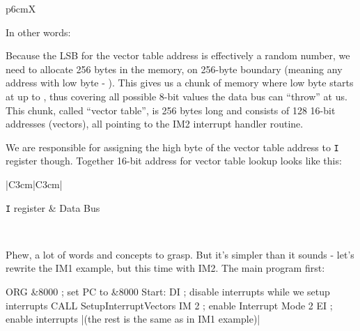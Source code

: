 \begin{tabularx}{\linewidth}{p{6cm}X}
	\begin{description}[topsep=0pt,itemsep=1pt,labelindent=-1.25ex,leftmargin=0cm]
		\item In other words:
		
		\item Because the LSB for the vector table address is effectively a random number, we need to allocate 256 bytes in the memory, on 256-byte boundary (meaning any address with low byte  - ). This gives us a chunk of memory where low byte starts at  up to , thus covering all possible 8-bit values the data bus can ``throw'' at us. This chunk, called ``vector table'', is 256 bytes long and consists of 128 16-bit addresses (vectors), all pointing to the IM2 interrupt handler routine.
		
		\item We are responsible for assigning the high byte of the vector table address to {\tt I} register though. Together 16-bit address for vector table lookup looks like this:
	\end{description}
	
	\vspace*{1ex}

	{ %
	\begin{ElegantTable}{|C{3cm}|C{3cm}|}
		\ElegantHeader{\EH{15-8} & \EH{7-0}}

		{\tt I} register & Data Bus \\
	\end{ElegantTable}
	}

	\\
\end{tabularx}

Phew, a lot of words and concepts to grasp. But it's simpler than it sounds - let's rewrite the IM1 example, but this time with IM2. The main program first:

\begin{tcblisting}{}
    ORG &8000              ; set PC to &8000
Start:
    DI                     ; disable interrupts while we setup interrupts
    CALL SetupInterruptVectors
    IM 2                   ; enable Interrupt Mode 2
    EI                     ; enable interrupts
    |(the rest is the same as in IM1 example)|
\end{tcblisting}

